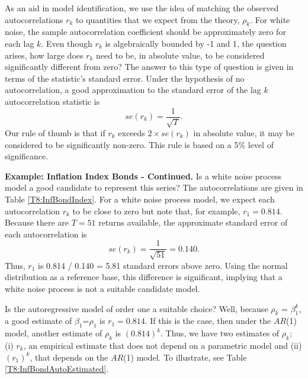 As an aid in model identification, we use the idea of matching the
observed autocorrelations $r_k$ to quantities that we expect from
the theory, $\rho_k$. For white noise, the sample autocorrelation
coefficient should be approximately zero for each lag $k$. Even
though $r_k$ is algebraically bounded by -1 and 1, the question
arises, how large does $r_k$ need to be, in absolute value, to be
considered significantly different from zero? The answer to this
type of question is given in terms of the statistic's standard
error. Under the hypothesis of no autocorrelation, a good
approximation to the standard error of the lag $k$ autocorrelation
statistic is
\begin{equation*}
se(r_k) = \frac{1}{\sqrt{T}}.
\end{equation*}
Our rule of thumb is that if $r_k$ exceeds $2 \times se(r_k)$ in
absolute value, it may be considered to be significantly non-zero.
This rule is based on a 5\% level of significance.

\linejed {}

\textbf{Example: Inflation Index Bonds - Continued.} Is a white
noise process model a good candidate to represent this series? The
autocorrelations are given in Table \ref{T8:InfBondIndex}. For a
white noise process model, we expect each autocorrelation $r_k$ to
be close to zero but note that, for example, $r_1=0.814$. Because
there are $T=51$ returns available, the approximate standard error
of each autocorrelation is
\begin{equation*}
se(r_k) = \frac{1}{\sqrt{51}} = 0.140.
\end{equation*}
Thus, $r_1$ is 0.814 / 0.140 = 5.81 standard errors above zero.
Using the normal distribution as a reference base, this difference
is significant, implying that a white noise process is not a
suitable candidate model.

Is the autoregressive model of order one a suitable choice? Well,
because $\rho_k$ = $\beta_1^{k}$, a good estimate of
$\beta_1$=$\rho_1$ is $r_1=0.814$. If this is the case, then under
the $AR$(1) model, another estimate of $\rho_k$ is $(0.814)^{k}$.
Thus, we have two estimates of $\rho_k$; (i) $r_k$, an empirical
estimate that does not depend on a parametric model and (ii)
$(r_1)^{k}$, that depends on the $AR$(1) model. To illustrate, see
Table \ref{T8:InfBondAutoEstimated}.



